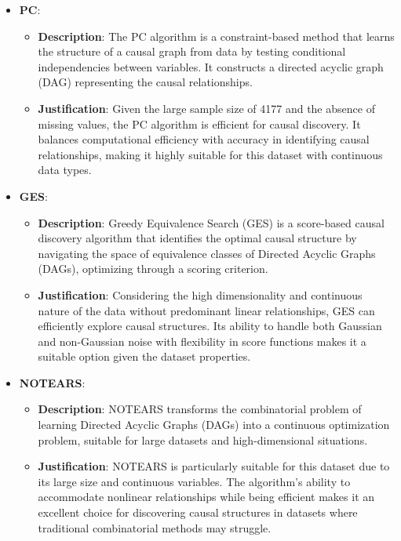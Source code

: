 \documentclass{article}
\begin{document}
\begin{itemize}
\item \textbf{PC}:
    \begin{itemize}
        \item \textbf{Description}: The PC algorithm is a constraint-based method that learns the structure of a causal graph from data by testing conditional independencies between variables. It constructs a directed acyclic graph (DAG) representing the causal relationships.
        \item \textbf{Justification}: Given the large sample size of 4177 and the absence of missing values, the PC algorithm is efficient for causal discovery. It balances computational efficiency with accuracy in identifying causal relationships, making it highly suitable for this dataset with continuous data types.
    \end{itemize}
                         
\item \textbf{GES}:
    \begin{itemize}
        \item \textbf{Description}: Greedy Equivalence Search (GES) is a score-based causal discovery algorithm that identifies the optimal causal structure by navigating the space of equivalence classes of Directed Acyclic Graphs (DAGs), optimizing through a scoring criterion.
        \item \textbf{Justification}: Considering the high dimensionality and continuous nature of the data without predominant linear relationships, GES can efficiently explore causal structures. Its ability to handle both Gaussian and non-Gaussian noise with flexibility in score functions makes it a suitable option given the dataset properties.
    \end{itemize}
                         
\item \textbf{NOTEARS}:
    \begin{itemize}
        \item \textbf{Description}: NOTEARS transforms the combinatorial problem of learning Directed Acyclic Graphs (DAGs) into a continuous optimization problem, suitable for large datasets and high-dimensional situations.
        \item \textbf{Justification}: NOTEARS is particularly suitable for this dataset due to its large size and continuous variables. The algorithm's ability to accommodate nonlinear relationships while being efficient makes it an excellent choice for discovering causal structures in datasets where traditional combinatorial methods may struggle.
    \end{itemize}
\end{itemize}
                    
\end{document}
